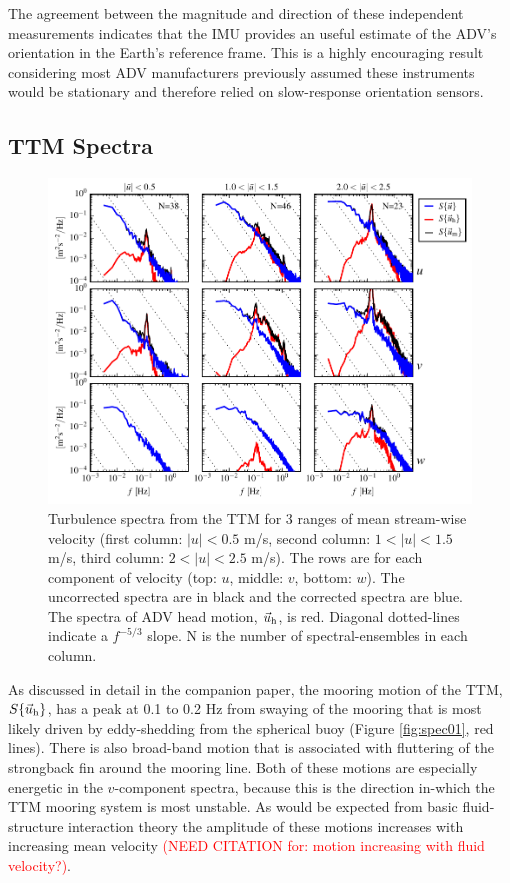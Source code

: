 \documentclass[twocol]{ametsoc}
\newcommand{\citeneeded}[1]{\textcolor{red}{(NEED CITATION for: #1)}}
\begin{document}
The agreement between the magnitude and direction of these independent measurements indicates that the IMU provides an useful estimate of the ADV's orientation in the Earth's reference frame. This is a highly encouraging result considering most ADV manufacturers previously assumed these instruments would be stationary and therefore relied on slow-response orientation sensors.

\subsection{TTM Spectra}

\begin{figure}[t]
  \centering
  \includegraphics{SpecFig02_TTM02B-top}
  \caption{Turbulence spectra from the TTM for 3 ranges of mean stream-wise velocity (first column: $|u|< 0.5$ m/s, second column: $1 < |u| < 1.5$ m/s, third column: $2 < |u| < 2.5$ m/s). The rows are for each component of velocity (top: $u$, middle: $v$, bottom: $w$). The uncorrected spectra are in black and the corrected spectra are blue. The spectra of ADV head motion, $\vec{u}_\mathrm{h}$, is red. Diagonal dotted-lines indicate a $f^{-5/3}$ slope. N is the number of spectral-ensembles in each column.}
  \label{fig:spec:ttm}
\end{figure}

As discussed in detail in the companion paper, the mooring motion of the TTM, $S\{\vec{u}_\mathrm{h}\}$, has a peak at 0.1 to 0.2 Hz from swaying of the mooring that is most likely driven by eddy-shedding from the spherical buoy (Figure \ref{fig:spec01}, red lines). There is also broad-band motion that is associated with fluttering of the strongback fin around the mooring line. Both of these motions are especially energetic in the $v$-component spectra, because this is the direction in-which the TTM mooring system is most unstable. As would be expected from basic fluid-structure interaction theory the amplitude of these motions increases with increasing mean velocity \citeneeded{motion increasing with fluid velocity?}.
\end{document}
